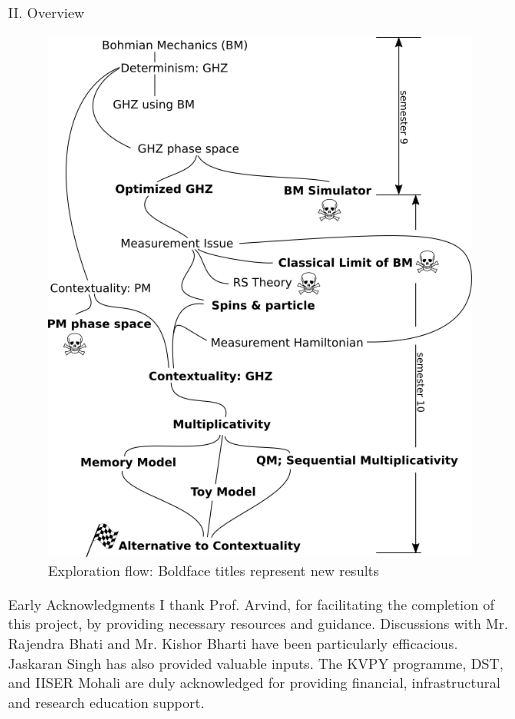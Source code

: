 \documentclass[final,hyperref={pdfpagelabels=false}]{beamer}
\begin{document}
\begin{frame}[t]
\begin{columns}[c]
\begin{column}{.31\textwidth}
\begin{block}{II. Overview}
            \begin{figure}
              \includegraphics[width=0.99\linewidth]{flow.png}
              \caption{Exploration flow: Boldface titles represent new results}
            \end{figure}

      \end{block}




      \begin{block}{Early Acknowledgments}
        I thank Prof. Arvind, for facilitating the completion of this project, by providing necessary resources and guidance. Discussions with Mr. Rajendra Bhati and Mr. Kishor Bharti have been particularly efficacious. Jaskaran Singh has also provided valuable inputs. The KVPY programme, DST, and IISER Mohali are duly acknowledged for providing financial, infrastructural and research education support.
      \end{block}


\end{column}
\end{columns}
\end{frame}
\end{document}
